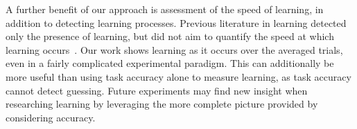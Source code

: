 A further benefit of our approach is assessment of the speed of learning, in 
addition to detecting learning processes. Previous literature in learning 
detected only the presence of learning, but did not aim to quantify the speed 
at which learning occurs~\cite{krigolson2014we}. Our work shows learning as it 
occurs over the averaged trials, even in a fairly complicated experimental 
paradigm. This can additionally be more useful than using task accuracy alone 
to measure learning, as task accuracy cannot detect guessing. Future 
experiments may find new insight when researching learning by leveraging the 
more complete picture provided by considering \tvt accuracy.

